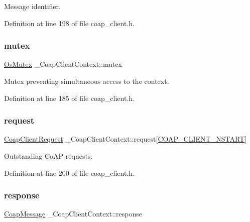Message identifier. 



Definition at line 198 of file coap\+\_\+client.\+h.

\mbox{\label{struct__CoapClientContext_aca958f920545fb498a5d1c6c61746372}} 
\subsubsection{\texorpdfstring{mutex}{mutex}}
{\footnotesize\ttfamily \hyperlink{structOsMutex}{Os\+Mutex} \+\_\+\+Coap\+Client\+Context\+::mutex}



Mutex preventing simultaneous access to the context. 



Definition at line 185 of file coap\+\_\+client.\+h.

\mbox{\label{struct__CoapClientContext_afb7087744490cb68a6d77ec4f9effde3}} 
\subsubsection{\texorpdfstring{request}{request}}
{\footnotesize\ttfamily \hyperlink{coap__client_8h_a3dac6728ded461f458ffd870eca7afe7}{Coap\+Client\+Request} \+\_\+\+Coap\+Client\+Context\+::request\mbox{[}\hyperlink{coap__client_8h_a1d9b5c1d8e03256e7164e0e26995654d}{C\+O\+A\+P\+\_\+\+C\+L\+I\+E\+N\+T\+\_\+\+N\+S\+T\+A\+RT}\mbox{]}}



Outstanding Co\+AP requests. 



Definition at line 200 of file coap\+\_\+client.\+h.

\mbox{\label{struct__CoapClientContext_a2cc779e38e244724dc96c6fff066217f}} 
\subsubsection{\texorpdfstring{response}{response}}
{\footnotesize\ttfamily \hyperlink{structCoapMessage}{Coap\+Message} \+\_\+\+Coap\+Client\+Context\+::response}



